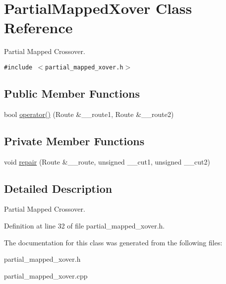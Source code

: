 \hypertarget{classPartialMappedXover}{
\section{Partial\-Mapped\-Xover Class Reference}
\label{classPartialMappedXover}
}
Partial Mapped Crossover.  


{\tt \#include $<$partial\_\-mapped\_\-xover.h$>$}

\subsection*{Public Member Functions}
\begin{CompactItemize}
\item 
\hypertarget{classPartialMappedXover_1cda6ea86ca36e5de0125f4ba5cfc695}{
bool \hyperlink{classPartialMappedXover_1cda6ea86ca36e5de0125f4ba5cfc695}{operator()} (Route \&\_\-\_\-route1, Route \&\_\-\_\-route2)}
\label{classPartialMappedXover_1cda6ea86ca36e5de0125f4ba5cfc695}

\end{CompactItemize}
\subsection*{Private Member Functions}
\begin{CompactItemize}
\item 
\hypertarget{classPartialMappedXover_b6d4035544aff3b2b3fe4b0eeea185a2}{
void \hyperlink{classPartialMappedXover_b6d4035544aff3b2b3fe4b0eeea185a2}{repair} (Route \&\_\-\_\-route, unsigned \_\-\_\-cut1, unsigned \_\-\_\-cut2)}
\label{classPartialMappedXover_b6d4035544aff3b2b3fe4b0eeea185a2}

\end{CompactItemize}


\subsection{Detailed Description}
Partial Mapped Crossover. 



Definition at line 32 of file partial\_\-mapped\_\-xover.h.

The documentation for this class was generated from the following files:\begin{CompactItemize}
\item 
partial\_\-mapped\_\-xover.h\item 
partial\_\-mapped\_\-xover.cpp\end{CompactItemize}
